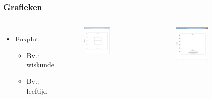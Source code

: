 \documentclass{beamer}
\begin{document}
\begin{frame}
  \frametitle{Grafieken}
  \begin{columns}[c]
    \begin{itemize}
      \item Boxplot
        \begin{itemize}
          \item Bv.: wiskunde
          \item Bv.: leeftijd
        \end{itemize}
    \end{itemize}

    \begin{figure}

      \includegraphics[width=0.6\textwidth]{img/oef3/boxplot-wiskunde}
    \end{figure}
    \begin{figure}

      \includegraphics[width=0.6\textwidth]{img/oef3/boxplot-leeftijd}
    \end{figure}
  \end{columns}
\end{frame}
\end{document}
